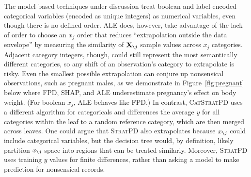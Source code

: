 \documentclass{article}
\newcommand{\figref}[1]{Figure~\ref{#1}}
\newcommand{\cut}[1]{}
\newcommand{\spd}{\fontfamily{cmr}\textsc{\small StratPD}}
\newcommand{\cspd}{\fontfamily{cmr}\textsc{\small CatStratPD}}
\newcommand{\Xnj}{${\bf X}_{\texttt{\char`\\} j}$}
\newcommand{\xnj}{$x_{\texttt{\char`\\} j}$}
\renewcommand{\slash}{\texttt{\char`\\}}
\DeclareMathOperator{\Ex}{\mathbb{E}}
\begin{document}
The model-based techniques under discussion treat boolean and label-encoded categorical variables (encoded as unique integers) as numerical variables, even though there is no defined order. ALE does, however, take advantage of the lack of order to choose an $x_j$ order that reduces ``extrapolation outside the data envelope'' by measuring the similarity of \Xnj{} sample values across $x_j$ categories.  Adjacent category integers, though, could still represent the most semantically different categories, so any shift of an observation's category to extrapolate is risky. Even the smallest possible extrapolation can conjure up nonsensical observations, such as pregnant males, as we demonstrate in \figref{fig:pregnant} below where FPD, SHAP, and ALE underestimate pregnancy's effect on body weight. (For boolean $x_j$, ALE behaves like FPD.)  In contrast, \cspd{} uses a different algorithm for categoricals and differences the average $y$ for all categories within the leaf to a random reference category, which are then merged across leaves. One could argue that \spd{} also extrapolates because \xnj{} could include categorical variables, but the decision tree would, by definition, likely partition \xnj{} space into regions that can be treated similarly. Moreover, \spd{} uses training $y$ values for finite differences, rather than asking a model to make prediction for nonsensical records.

\cut{
{\bf Comparison}

${\it FPD}_j(z) = \Ex[\hat{f}(x_{j}=z,{\bf X}_{\slash j})])$

SHAP for one $S$ is $\phi_j(\hat{f},{\bf x}) = \Ex[\hat{f}(x_{S \cup \{j\}},{\bf X}_{\slash (S \cup \{j\})})  | {\bf X}_{S \cup \{j\}} = x_{S \cup \{j\}}] - \Ex[\hat{f}(x_{S},{\bf X}_{\slash S})  | {\bf X}_S = x_S ]$ for all subsets $S \subset F$ for $F = \{1, 2, .., p\}$. When $S = F \slash \{j\}$, like ALE, it becomes $\Ex[\hat{f}(x_F)] - \Ex[\hat{f}(x_{F \slash \{j\}},{\bf X}_j)]$ or $\hat{f}({\bf x}) - \text{\it FPD}_{F \slash \{j\}}(x)$ if assume independence.

ALE at $x_j=z$, it is cumsum of $\Ex[\hat{f}(b_k, {\bf X}_{\slash j}) - \hat{f}(b_{k-1}, {\bf X}_{\slash j}) \, | \, x_j \in (b_{k-1},b_k]]$ for bin $b_k$ partitioning min..max for var $j$ into $K$ intervals.

StratPD at $x_j=z$ is $\Ex[ (y^{(i_L+1)} - y^{i_L})/(x_j^{(i_L+1)} - x_j^{(i_L)}) \, | \, z \in [x_j^{(i_L+1)} - x_j^{(i_L)}) \text{ and } L \in T]$

$\Ex[ \phi_j(\hat{f},x) | {\bf X}_j = z] = FPD_j(x) - \bar{y}$ if features independent. SHAP's implementation approximates $\hat{f}$ trained on just $S$ features, $\hat{f}_S(x_S)$, with $\Ex[\hat{f}(x_{S},{\bf X}_{\bar{S}})]$ by assuming independent features.
}
\end{document}
